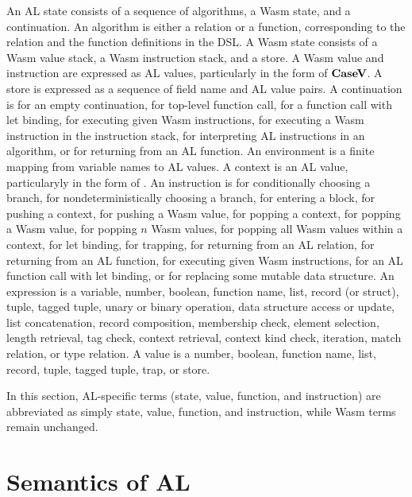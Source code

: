 An AL state consists of a sequence of algorithms, a Wasm state, and a
continuation.
An algorithm is either a relation or a function, corresponding to the relation
and the function definitions in the DSL.
A Wasm state consists of a Wasm value stack, a Wasm instruction stack, and a
store.
A Wasm value and instruction are expressed as AL values, particularly in the
form of $\textbf{CaseV}$.
A store is expressed as a sequence of field name and AL value pairs.
A continuation is \mt{} for an empty continuation, \toplevelcall{} for
top-level function call, \call{} for a function call with let binding, \exe{}
for executing given Wasm instructions, \wasm{} for executing a Wasm instruction
in the instruction stack, \algo{} for interpreting AL instructions in an
algorithm, or \ret{} for returning from an AL function.
An environment is a finite mapping from variable names to AL values.
A context is an AL value, particularyly in the form of \casev{}.
An instruction is \ifi{} for conditionally choosing a branch, \eitheri{} for
nondeterministically choosing a branch, \enteri{} for entering a block,
\pushctxi{} for pushing a context, \pushi{} for pushing a Wasm value,
\popctxi{} for popping a context, \popi{} for popping a Wasm value, \popni{}
for popping $n$ Wasm values, \popalli{} for popping all Wasm values within a
context,  for let binding, \trapi{} for trapping, \returnreli{} for
returning from an AL relation, \returnfunci{} for returning from an AL
function, \executei{} for executing given Wasm instructions, \calli{} for an AL
function call with let binding, or \replacei{} for replacing some mutable data
structure.
An expression is a variable, number, boolean, function name, list, record (or
struct), tuple, tagged tuple, unary or binary operation, data structure access
or update, list concatenation, record composition, membership check, element
selection, length retrieval, tag check, context retrieval, context kind check,
iteration, match relation, or type relation.
A value is a number, boolean, function name, list, record, tuple, tagged tuple,
trap, or store.


In this section, AL-specific terms (state, value, function, and instruction)
are abbreviated as simply state, value, function, and instruction, while Wasm
terms remain unchanged.




\newpage
\section{Semantics of AL}
\label{semantics}

